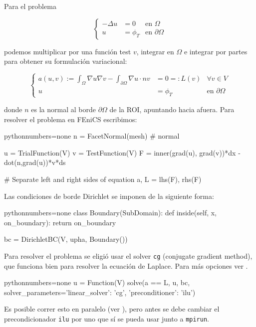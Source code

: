Para el problema 

\[
\left\{
\begin{array}{rll}
-\Delta u &= 0 & \text{en} \,\, \Omega \\
u &= \phi_T & \text{en} \,\, \partial \Omega
\end{array}
\right.
\]
 
podemos multiplicar por una función test $v$, integrar en $\Omega$ e integrar por partes para obtener su formulación variacional:

\[
\left\{
\begin{array}{rll}
\displaystyle{a(u,v):= \int_{\Omega} \nabla u \nabla v - \int_{\partial \Omega} \nabla u \cdot n v} &= 0=: L(v) & \forall v \in V\\
u &= \phi_T & \text{en} \,\, \partial \Omega
\end{array}
\right.
\]

donde $n$ es la normal al borde $\partial \Omega$ de la ROI, apuntando hacia afuera. Para resolver el problema en FEniCS escribimos:

\begin{sourcecodep}{python}{numbers=none}{}
n = FacetNormal(mesh) # normal

u = TrialFunction(V)
v = TestFunction(V)
F = inner(grad(u), grad(v))*dx -dot(n,grad(u))*v*ds

# Separate left and right sides of equation
a, L = lhs(F), rhs(F)
\end{sourcecodep}

Las condiciones de borde Dirichlet se imponen de la siguiente forma:

\begin{sourcecodep}{python}{numbers=none}{}
class Boundary(SubDomain):
    def inside(self, x, on_boundary):
        return on_boundary

bc = DirichletBC(V, upha, Boundary())
\end{sourcecodep}

Para resolver el problema se eligió usar el solver \texttt{cg} (conjugate gradient method), que funciona bien para resolver la ecuación de Laplace. Para más opciones ver \cite{solvers}.

\begin{sourcecodep}{python}{numbers=none}{}
u = Function(V)
solve(a == L, u, bc, solver_parameters={'linear_solver': 'cg', 'preconditioner': 'ilu'})
\end{sourcecodep}

Es posible correr esto en paralelo (ver \cite{mpirun}), pero antes se debe cambiar el precondicionador \texttt{ilu} por uno que sí se pueda usar junto a \texttt{mpirun}.\\

